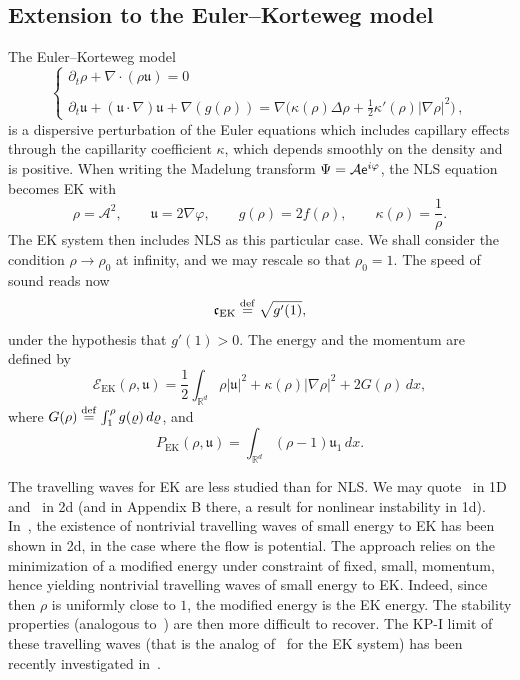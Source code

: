 \documentclass[AHL,Unicode,longabstracts,published]{cedram}
\newcommand*\p{\partial}
\newcommand*\R{\mathbb R}
\newcommand*\ddef{\stackrel{\rm def}{=}}
\newcommand{\EK}{\mathrm{EK}}
\newcommand*\BE{\mathcal{E}}
\newcommand*\BA{\mathcal{A}}
\newcommand*\ds{\displaystyle}
\newcommand*\ex{{\sf e}}
\newcommand*\cs{{\mathfrak c}}
\renewcommand*\u{\mathfrak{u}}
\newcommand*\vp{\varphi}
\begin{document}
\subsection{Extension to the Euler--Korteweg model}

The Euler--Korteweg model
\begin{equation}
\tag{EK}
\begin{cases}
\ds{ \p_t \rho + \nabla \cdot (\rho \u) } = 0 \\ \ \\
\ds{ \p_{t} \u + (\u \cdot \nabla) \u + \nabla (g (\rho)) = \nabla \Big(\kappa(\rho) \Delta \rho + \frac12 \kappa'(\rho) |\nabla \rho |^2 \Big) } \,,
\end{cases}
\end{equation}
is a dispersive perturbation of the Euler equations which includes capillary effects through the capillarity coefficient $ \kappa $, which depends smoothly on the density and is positive. When writing the Madelung transform $ \Psi = \BA \ex^{ i \vp } $, the NLS equation becomes EK with
\[
\rho = \BA^2,
\quad \quad
\u = 2 \nabla \vp,
\quad \quad g(\rho) = 2 f(\rho),
\quad \quad
\kappa(\rho) = \frac{1}{ \rho }.
\]
The EK system then includes NLS as this particular case. We shall consider the condition $ \rho \to \rho_0 $ at infinity, and we may rescale so that $ \rho_0 = 1 $. The speed of sound reads now
\[
\cs_{\EK} \ddef\sqrt{ g'(1) },
\]
under the hypothesis that $ g'(1) > 0 $. The energy and the momentum are defined by
\[
\BE_{\EK} (\rho, \u) = \frac{1}{2} \int_{\R^d} \rho \lvert \u \rvert^2 + \kappa (\rho) \lvert \nabla \rho \rvert^2 + 2 G(\rho) \, dx,
\]
where $ G(\rho) \ddef \int_1^\rho g(\varrho) \, d \varrho $, and
\[
P_{\EK} (\rho, \u) = \int_{\R^d} (\rho -1) \u_1 \, dx.
\]

The travelling waves for EK are less studied than for NLS. We may quote~\cite{Ben_TWEK} in 1D and~\cite{Audiard_OP-TW} in 2d (and in Appendix B there, a result for nonlinear instability in 1d). In~\cite{Audiard_OP-TW}, the existence of nontrivial travelling waves of small energy to EK has been shown in 2d, in the case where the flow is potential. The approach relies on the minimization of a modified energy under constraint of fixed, small, momentum, hence yielding nontrivial travelling waves of small energy to EK. Indeed, since then $ \rho $ is uniformly close to $1 $, the modified energy is the EK energy. The stability properties (analogous to~\cite{CM1}) are then more difficult to recover. The KP-I limit of these travelling waves (that is the analog of~\cite{BGStranso2d} for the EK system) has been recently investigated in~\cite{Vassenet}.
\end{document}
